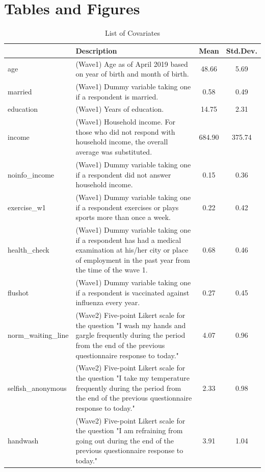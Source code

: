 \documentclass[
]{article}
\begin{document}
\clearpage

\hypertarget{fig-tab}{%
\section{Tables and Figures}\label{fig-tab}}

\begin{table}[!h]

\caption{\label{tab:covariate-list}List of Covariates}
\centering
\fontsize{9}{11}\selectfont
\begin{tabular}[t]{l>{\raggedright\arraybackslash}p{30em}cc}
\toprule
  & Description & Mean & Std.Dev.\\
\midrule
age & (Wave1) Age as of April 2019 based on year of birth and month of birth. & \num{48.66} & \num{5.69}\\
married & (Wave1) Dummy variable taking one if a respondent is married. & \num{0.58} & \num{0.49}\\
education & (Wave1) Years of education. & \num{14.75} & \num{2.31}\\
income & (Wave1) Household income. For those who did not respond with household income, the overall average was substituted. & \num{684.90} & \num{375.74}\\
noinfo\_income & (Wave1) Dummy variable taking one if a respondent did not answer household income. & \num{0.15} & \num{0.36}\\
exercise\_w1 & (Wave1) Dummy variable taking one if a respondent exercises or plays sports more than once a week. & \num{0.22} & \num{0.42}\\
health\_check & (Wave1) Dummy variable taking one if a respondent has had a medical examination at his/her city or place of employment in the past year from the time of the wave 1. & \num{0.68} & \num{0.46}\\
flushot & (Wave1) Dummy variable taking one if a respondent is vaccinated against influenza every year. & \num{0.27} & \num{0.45}\\
norm\_waiting\_line & (Wave2) Five-point Likert scale for the question "I wash my hands and gargle frequently during the period from the end of the previous questionnaire response to today." & \num{4.07} & \num{0.96}\\
selfish\_anonymous & (Wave2) Five-point Likert scale for the question "I take my temperature frequently during the period from the end of the previous questionnaire response to today." & \num{2.33} & \num{0.98}\\
handwash & (Wave2) Five-point Likert scale for the question "I am refraining from going out during the end of the previous questionnaire response to today." & \num{3.91} & \num{1.04}\\

\end{tabular}
\end{table}
\end{document}
